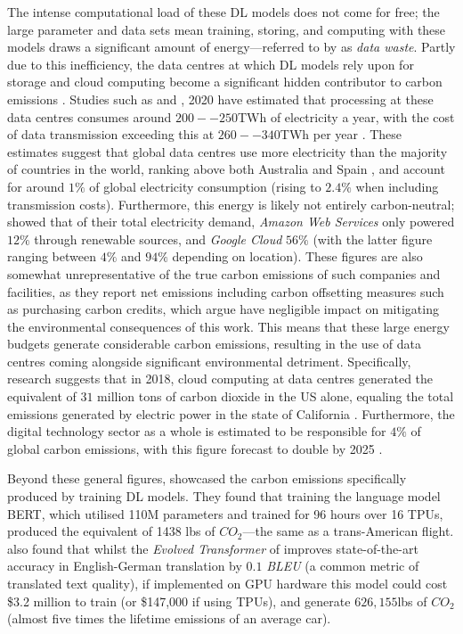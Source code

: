 \documentclass[a4paper, 11pt]{report}
\begin{document}
    The intense computational load of these DL models does not come for free; the large parameter and data sets mean training, storing, and computing with these models draws a significant amount of energy---referred to by \citet{bietti-2019} as \emph{data waste}. Partly due to this inefficiency, the data centres at which DL models rely upon for storage and cloud computing become a significant hidden contributor to carbon emissions \citep{aljarrah-2015}. Studies such as \citet{masanet-2020} and \citet{malmodin-2018}, 2020 have estimated that processing at these data centres consumes around $200--250$TWh of electricity a year, with the cost of data transmission exceeding this at $260--340$TWh per year \citep{iea-2022}. These estimates suggest that global data centres use more electricity than the majority of countries in the world, ranking above both Australia and Spain \citep{eia-2019}, and account for around $1\%$ of global electricity consumption (rising to $2.4\%$ when including transmission costs). Furthermore, this energy is likely not entirely carbon-neutral; \citet{cook-2017} showed that of their total electricity demand, \emph{Amazon Web Services} only powered $12\%$ through renewable sources, and \emph{Google Cloud} $56\%$ (with the latter figure ranging between $4\%$ and $94\%$ depending on location). These figures are also somewhat unrepresentative of the true carbon emissions of such companies and facilities, as they report net emissions including carbon offsetting measures such as purchasing carbon credits, which \citet{schwartz-2019} argue have negligible impact on mitigating the environmental consequences of this work. This means that these large energy budgets generate considerable carbon emissions, resulting in the use of data centres coming alongside significant environmental detriment. Specifically, research suggests that in 2018, cloud computing at data centres generated the equivalent of $31$ million tons of carbon dioxide \citep{hockstad-2018} in the US alone, equaling the total emissions generated by electric power in the state of California \citep{iea-2022}. Furthermore, the digital technology sector as a whole is estimated to be responsible for $4\%$ of global carbon emissions, with this figure forecast to double by 2025 \citep{bietti-2019}.

    Beyond these general figures, \citet{strubell-2019} showcased the carbon emissions specifically produced by training DL models. They found that training the language model BERT, which utilised 110M parameters and trained for 96 hours over 16 TPUs, produced the equivalent of 1438 lbs of $CO_2$---the same as a trans-American flight. \citeauthor{strubell-2019} also found that whilst the \emph{Evolved Transformer} of \citet{so-2019} improves state-of-the-art accuracy in English-German translation by $0.1$ \emph{BLEU} (a common metric of translated text quality), if implemented on GPU hardware this model could cost \$3.2 million to train (or \$147,000 if using TPUs), and generate $626,155$lbs of $CO_2$ (almost five times the lifetime emissions of an average car).
\end{document}
